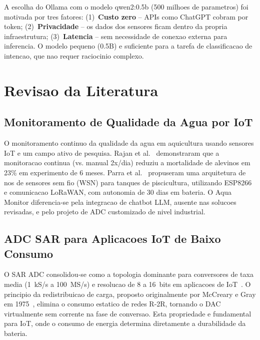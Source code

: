 \documentclass[12pt, a4paper]{article}
\begin{document}
\begin{conceitobox}
A escolha do Ollama com o modelo qwen2:0.5b (500 milhoes de parametros) foi motivada por
tres fatores: (1)~\textbf{Custo zero} -- APIs como ChatGPT cobram por token; (2)~\textbf{Privacidade}
-- os dados dos sensores ficam dentro da propria infraestrutura; (3)~\textbf{Latencia} -- sem
necessidade de conexao externa para inferencia. O modelo pequeno (0.5B) e suficiente para
a tarefa de classificacao de intencao, que nao requer raciocinio complexo.
\end{conceitobox}

\section{Revisao da Literatura}

\subsection{Monitoramento de Qualidade da Agua por IoT}

O monitoramento continuo da qualidade da agua em aquicultura usando sensores IoT e um campo
ativo de pesquisa. Rajan et al.~\cite{aquaculture2019} demonstraram que a monitoracao continua
(vs. manual 2x/dia) reduziu a mortalidade de alevinos em 23\% em experimento de 6 meses.
Parra et al.~\cite{parra2018} propuseram uma arquitetura de nos de sensores sem fio (WSN)
para tanques de piscicultura, utilizando ESP8266 e comunicacao LoRaWAN, com autonomia de
30 dias em bateria. O Aqua Monitor diferencia-se pela integracao de chatbot LLM, ausente
nas solucoes revisadas, e pelo projeto de ADC customizado de nivel industrial.

\subsection{ADC SAR para Aplicacoes IoT de Baixo Consumo}

O SAR ADC consolidou-se como a topologia dominante para conversores de taxa media (1~kS/s a
100~MS/s) e resolucao de 8 a 16~bits em aplicacoes de IoT~\cite{murmann2021}. O principio
da redistribuicao de carga, proposto originalmente por McCreary e Gray em 1975~\cite{mccreary1975},
elimina o consumo estatico de redes R-2R, tornando o DAC virtualmente sem corrente na fase
de conversao. Esta propriedade e fundamental para IoT, onde o consumo de energia determina
diretamente a durabilidade da bateria.
\end{document}
